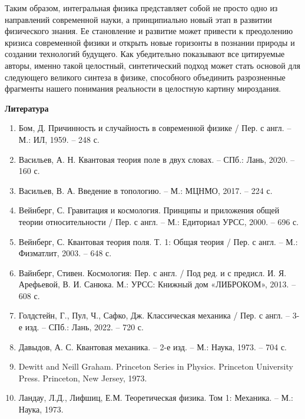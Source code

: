    Таким образом, интегральная физика представляет собой не просто одно из направлений современной науки, а принципиально новый этап в развитии физического знания. Ее становление и развитие может привести к преодолению кризиса современной физики и открыть новые горизонты в познании природы и создании технологий будущего. Как убедительно показывают все цитируемые авторы, именно такой целостный, синтетический подход может стать основой для следующего великого синтеза в физике, способного объединить разрозненные фрагменты нашего понимания реальности в целостную картину мироздания.

    \begin{center}
        \textbf{Литература}
    \end{center}

    \begin{enumerate}
        \item Бом, Д. Причинность и случайность в современной физике / Пер. с англ. – М.: ИЛ, 1959. – 248 с.
        \item Васильев, А. Н. Квантовая теория поле в двух словах. – СПб.: Лань, 2020. – 160 с.
        \item Васильев, В. А. Введение в топологию. – М.: МЦНМО, 2017. – 224 с.
        \item Вейнберг, С. Гравитация и космология. Принципы и приложения общей теории относительности / Пер. с англ. – М.: Едиториал УРСС, 2000. – 696 с.
        \item Вейнберг, С. Квантовая теория поля. Т. 1: Общая теория / Пер. с англ. – М.: Физматлит, 2003. – 648 с.
        \item Вайнберг, Стивен. Космология: Пер. с англ. / Под ред. и с предисл. И. Я. Арефьевой, В. И. Санюка. М.: УРСС: Книжный дом «ЛИБРОКОМ», 2013. – 608 с.
        \item Голдстейн, Г., Пул, Ч., Сафко, Дж. Классическая механика / Пер. с англ. – 3-е изд. – СПб.: Лань, 2022. – 720 с.
        \item Давыдов, А. С. Квантовая механика. – 2-е изд. – М.: Наука, 1973. – 704 с.
        \item Dewitt and Neill Graham. Princeton Series in Physics. Princeton University Press. Princeton, New Jersey, 1973.
        \item Ландау, Л.Д., Лифшиц, Е.М. Теоретическая физика. Том 1: Механика. – М.: Наука, 1973.
    \end{enumerate}
\fi

